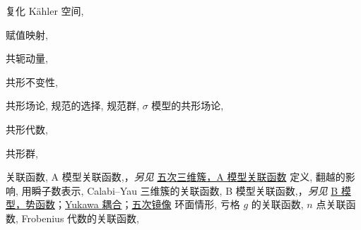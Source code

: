 \begin{theindex}
\subitem \leavevmode\hypertarget{idx:0143}{复化 Kähler 空间},\enspace{}
\indexspace
\item \leavevmode\hypertarget{idx:0276}{赋值映射},\enspace{}
\indexspace
\item \leavevmode\hypertarget{idx:0171}{共轭动量},\enspace{}
\indexspace
\item \leavevmode\hypertarget{idx:0167}{共形不变性},\enspace{}
\indexspace
\item \leavevmode\hypertarget{idx:0162}{共形场论},\enspace{}
\subitem \leavevmode\hypertarget{idx:0163}{规范的选择},\enspace{}
\subitem \leavevmode\hypertarget{idx:0164}{规范群},\enspace{}
\subitem \leavevmode\hypertarget{idx:0165}{$\sigma$ 模型的共形场论},\enspace{}
\indexspace
\item \leavevmode\hypertarget{idx:0161}{共形代数},\enspace{}
\indexspace
\item \leavevmode\hypertarget{idx:0166}{共形群},\enspace{}
\indexspace
\item \leavevmode\hypertarget{idx:0183}{关联函数},\enspace{}
\subitem \leavevmode\hypertarget{idx:0184}{A 模型关联函数},\enspace{}，\textit{另见} \hyperlink{idx:1183}{五次三维簇，A 模型关联函数}
\subsubitem \leavevmode\hypertarget{idx:0185}{定义},\enspace{}
\subsubitem \leavevmode\hypertarget{idx:0186}{翻越的影响},\enspace{}
\subsubitem \leavevmode\hypertarget{idx:0187}{用瞬子数表示},\enspace{}
\subsubitem \leavevmode\hypertarget{idx:0188}{Calabi--Yau 三维簇的关联函数},\enspace{}
\subitem \leavevmode\hypertarget{idx:0189}{B 模型关联函数},\enspace{}，\textit{另见} \hyperlink{idx:0064}{B 模型，势函数}；\hyperlink{idx:1444}{Yukawa 耦合}；\hyperlink{idx:1164}{五次镜像}
\subsubitem \leavevmode\hypertarget{idx:0190}{环面情形},\enspace{}
\subitem \leavevmode\hypertarget{idx:0191}{亏格 $g$ 的关联函数},\enspace{}
\subitem \leavevmode\hypertarget{idx:0192}{$n$ 点关联函数},\enspace{}
\subitem \leavevmode\hypertarget{idx:0193}{Frobenius 代数的关联函数},\enspace{}

\end{theindex}
